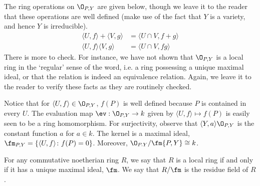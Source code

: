 The ring operations on $\O_{P,Y}$ are given below, though we leave it to the reader that these operations are well defined (make use of the fact that $Y$ is a variety, and hence $Y$ is irreducible). 
	\[
	\begin{split}
	\langle U,f \rangle + \langle V,g \rangle&= \langle U \cap V, f+g \rangle \\
	\langle U,f \rangle \langle V,g \rangle&= \langle U \cap V, fg \rangle 
	\end{split}
	\]
There is more to check. For instance, we have not shown that $\O_{P,Y}$ is a local ring in the `regular' sense of the word, i.e. a ring possessing a unique maximal ideal, or that the relation is indeed an equivalence relation. Again, we leave it to the reader to verify these facts as they are routinely checked. 
















































Notice that for $\langle U,f \rangle \in \O_{P,Y}$, $f(P)$ is well defined because $P$ is contained in every $U$. The evaluation map $\ev: \O_{P,Y} \to k$ given by $\langle U,f \rangle \mapsto f(P)$ is easily seen to be a ring homomorphism. For surjectivity, observe that $\langle Y, a \rangle \O_{P,Y}$ is the constant function $a$ for $a \in k$. The kernel is a maximal ideal, $\fm_{P,Y}= \{ \langle U,f \rangle \colon f(P)=0 \}$. Moreover, $\O_{P.Y}/ \fm{P,Y} \cong k$. 


\begin{rem}
For any commutative noetherian ring $R$, we say that $R$ is a local ring if and only if it has a unique maximal ideal, $\fm$. We say that $R/\fm$ is the residue field of $R$. 
\end{rem}


